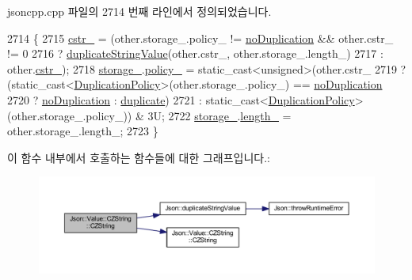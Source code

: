 jsoncpp.\+cpp 파일의 2714 번째 라인에서 정의되었습니다.


\begin{DoxyCode}
2714                                              \{
2715   \hyperlink{class_json_1_1_value_1_1_c_z_string_a5b4d28349294034d7f779c3c95d0306c}{cstr\_} = (other.storage\_.policy\_ != \hyperlink{class_json_1_1_value_1_1_c_z_string_a2805c46fb4a72bbaed55de6d75941b6da08d540450fa6c4af57eaacf063eedd20}{noDuplication} && other.cstr\_ != 0
2716                  ? \hyperlink{namespace_json_a678ac3a60cd70ec0fb4c9abfd40eb0c4}{duplicateStringValue}(other.cstr\_, other.storage\_.length\_)
2717                  : other.\hyperlink{class_json_1_1_value_1_1_c_z_string_a5b4d28349294034d7f779c3c95d0306c}{cstr\_});
2718   \hyperlink{class_json_1_1_value_1_1_c_z_string_a17c92f0f089a4314e3b1d5695dc1a851}{storage\_}.\hyperlink{struct_json_1_1_value_1_1_c_z_string_1_1_string_storage_a7f68c8d6197c5692a525854b5f29f87b}{policy\_} = \textcolor{keyword}{static\_cast<}\textcolor{keywordtype}{unsigned}\textcolor{keyword}{>}(other.cstr\_
2719                  ? (\textcolor{keyword}{static\_cast<}\hyperlink{class_json_1_1_value_1_1_c_z_string_a2805c46fb4a72bbaed55de6d75941b6d}{DuplicationPolicy}\textcolor{keyword}{>}(other.storage\_.policy\_) == 
      \hyperlink{class_json_1_1_value_1_1_c_z_string_a2805c46fb4a72bbaed55de6d75941b6da08d540450fa6c4af57eaacf063eedd20}{noDuplication}
2720                      ? \hyperlink{class_json_1_1_value_1_1_c_z_string_a2805c46fb4a72bbaed55de6d75941b6da08d540450fa6c4af57eaacf063eedd20}{noDuplication} : \hyperlink{class_json_1_1_value_1_1_c_z_string_a2805c46fb4a72bbaed55de6d75941b6dabb2134294dd8fc37dd82d18bb794fe20}{duplicate})
2721                  : \textcolor{keyword}{static\_cast<}\hyperlink{class_json_1_1_value_1_1_c_z_string_a2805c46fb4a72bbaed55de6d75941b6d}{DuplicationPolicy}\textcolor{keyword}{>}(other.storage\_.policy\_)) & 3U;
2722   \hyperlink{class_json_1_1_value_1_1_c_z_string_a17c92f0f089a4314e3b1d5695dc1a851}{storage\_}.\hyperlink{struct_json_1_1_value_1_1_c_z_string_1_1_string_storage_a165d865c44e6471d34668eeb4f15b140}{length\_} = other.storage\_.length\_;
2723 \}
\end{DoxyCode}
이 함수 내부에서 호출하는 함수들에 대한 그래프입니다.\+:\nopagebreak
\begin{figure}[H]
\begin{center}
\leavevmode
\includegraphics[width=350pt]{class_json_1_1_value_1_1_c_z_string_a9685070d440335b55ef5c85747d25157_cgraph}
\end{center}
\end{figure}

